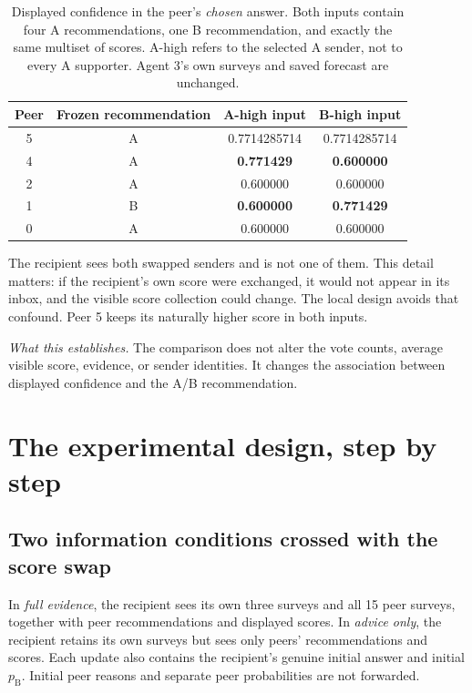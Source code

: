 \documentclass[11pt]{article}
\newcommand{\takeaway}[1]{\par\smallskip\noindent\textit{What this establishes.} #1\par\medskip}
\newcommand{\pB}{p_{\mathrm B}}
\begin{document}
\begin{table}[htbp]\centering\small
\begin{tabular}{@{}cccc@{}}\toprule
Peer & Frozen recommendation & A-high input & B-high input \\\midrule
5 & A & 0.7714285714 & 0.7714285714 \\
4 & A & \textbf{0.771429} & \textbf{0.600000} \\
2 & A & 0.600000 & 0.600000 \\
1 & B & \textbf{0.600000} & \textbf{0.771429} \\
0 & A & 0.600000 & 0.600000 \\\bottomrule
\end{tabular}
\caption{Displayed confidence in the peer's \emph{chosen} answer. Both inputs contain four A recommendations, one B recommendation, and exactly the same multiset of scores. A-high refers to the selected A sender, not to every A supporter. Agent 3's own surveys and saved forecast are unchanged.}
\label{tab:swap}\end{table}

The recipient sees both swapped senders and is not one of them. This detail matters: if the recipient's own score were exchanged, it would not appear in its inbox, and the visible score collection could change. The local design avoids that confound. Peer 5 keeps its naturally higher score in both inputs.

\takeaway{The comparison does not alter the vote counts, average visible score, evidence, or sender identities. It changes the association between displayed confidence and the A/B recommendation.}

\section{The experimental design, step by step}
\label{sec:design}
\subsection{Two information conditions crossed with the score swap}
In \emph{full evidence}, the recipient sees its own three surveys and all 15 peer surveys, together with peer recommendations and displayed scores. In \emph{advice only}, the recipient retains its own surveys but sees only peers' recommendations and scores. Each update also contains the recipient's genuine initial answer and initial $\pB$. Initial peer reasons and separate peer probabilities are not forwarded.
\end{document}
